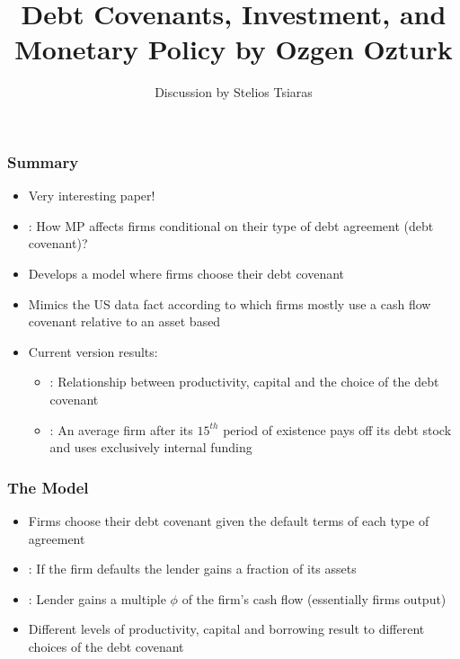 \documentclass[xcolor=dvipsnames,handout]{beamer}
\title[\today]{\textbf{Debt Covenants, Investment, and Monetary Policy by Ozgen Ozturk}}
\author{Discussion by Stelios Tsiaras}
\institute{European University Institute}
\begin{document}
\begin{frame}[noframenumbering]
\titlepage 
\end{frame}

\begin{frame}[t]\frametitle {\textbf{Summary}} \label{conclusion}
\begin{itemize}
    \item Very interesting paper!
    \item {\color{blue}{Main question}}: How MP affects firms conditional on their type of debt agreement (debt covenant)? \pause
    \item Develops a model where firms choose their debt covenant 
    \item Mimics the US data fact according to which firms mostly use a cash flow covenant relative to an asset based
    \item Current version results:
    \begin{itemize}
        \item {\color{blue}{Result 1}}: Relationship between productivity, capital and the choice of the debt covenant
        \item {\color{blue}{Result 2}}: An average firm after its $15^{th}$ period of existence pays off its debt stock and uses exclusively internal funding
    \end{itemize}
\end{itemize}
\end{frame}

\begin{frame}[t]\frametitle {\textbf{The Model}} \label{conclusion}
\begin{itemize}
\item Firms choose their debt covenant given the default terms of each type of agreement
    \item {\color{blue}{Asset based}}: If the firm defaults the lender gains a fraction of its assets
    \item {\color{blue}{Cash-flow based}}: Lender gains a multiple $\phi$ of the firm's cash flow (essentially firms output)
    \item Different levels of productivity, capital and borrowing result to different choices of the debt covenant

\end{itemize}
\end{frame}
\end{document}
